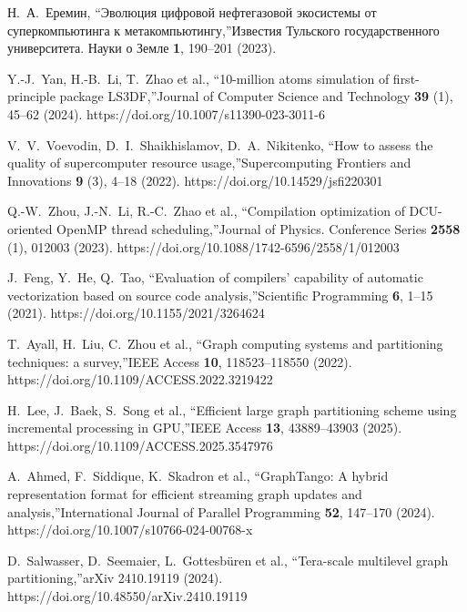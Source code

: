 \documentclass[
11pt,%
tightenlines,%
twoside,%
onecolumn,%
nofloats,%
nobibnotes,%
nofootinbib,%
superscriptaddress,%
noshowpacs,%
centertags]%
{revtex4}
\begin{document}
\begin{thebibliography}{99}
Н.~А.~Еремин, \textquotedblleft Эволюция цифровой нефтегазовой экосистемы от суперкомпьютинга к метакомпьютингу,\textquotedblright Известия Тульского государственного университета. Науки о Земле \textbf{1}, 190--201 (2023).

Y.-J.~Yan, H.-B.~Li, T.~Zhao et al., \textquotedblleft 10-million atoms simulation of first-principle package LS3DF,\textquotedblright Journal of Computer Science and Technology \textbf{39} (1), 45--62 (2024). https://doi.org/10.1007/s11390-023-3011-6

V.~V.~Voevodin, D.~I.~Shaikhislamov, D.~A.~Nikitenko, \textquotedblleft How to assess the quality of supercomputer resource usage,\textquotedblright Supercomputing Frontiers and Innovations \textbf{9} (3), 4--18 (2022). https://doi.org/10.14529/jsfi220301

Q.-W.~Zhou, J.-N.~Li, R.-C.~Zhao et al., \textquotedblleft Compilation optimization of DCU-oriented OpenMP thread scheduling,\textquotedblright Journal of Physics. Conference Series \textbf{2558} (1), 012003 (2023). https://doi.org/10.1088/1742-6596/2558/1/012003

J.~Feng, Y.~He, Q.~Tao, \textquotedblleft Evaluation of compilers’ capability of automatic vectorization based on source code analysis,\textquotedblright Scientific Programming \textbf{6}, 1--15 (2021). https://doi.org/10.1155/2021/3264624

T.~Ayall, H.~Liu, C.~Zhou et al., \textquotedblleft Graph computing systems and partitioning techniques: a survey,\textquotedblright IEEE Access \textbf{10}, 118523--118550 (2022). https://doi.org/10.1109/ACCESS.2022.3219422

H.~Lee, J.~Baek, S.~Song et al., \textquotedblleft Efficient large graph partitioning scheme using incremental processing in GPU,\textquotedblright IEEE Access \textbf{13}, 43889--43903 (2025). https://doi.org/10.1109/ACCESS.2025.3547976

A.~Ahmed, F.~Siddique, K.~Skadron et al., \textquotedblleft GraphTango: A hybrid representation format for efficient streaming graph updates and analysis,\textquotedblright International Journal of Parallel Programming \textbf{52}, 147--170 (2024). https://doi.org/10.1007/s10766-024-00768-x

D.~Salwasser, D.~Seemaier, L.~Gottesb\"uren et al., \textquotedblleft Tera-scale multilevel graph partitioning,\textquotedblright arXiv 2410.19119 (2024). https://doi.org/10.48550/arXiv.2410.19119


\end{thebibliography}
\end{document}
